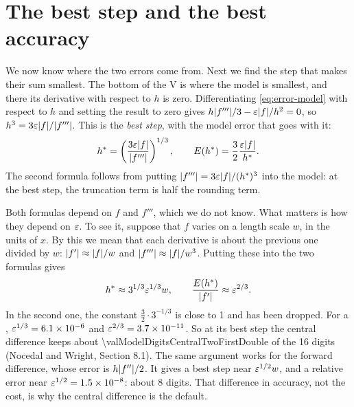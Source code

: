 \section{The best step and the best accuracy}\label{sec:rounding-best}

We now know where the two errors come from. Next we find the step that makes their sum smallest. The bottom of the V
is where the model is smallest, and there its derivative with respect to $h$ is zero. Differentiating
\cref{eq:error-model} with respect to $h$ and setting the result to zero gives
$h \lvert f''' \rvert / 3 - \varepsilon \lvert f \rvert / h^2 = 0$, so $h^3 = 3 \varepsilon \lvert f \rvert / \lvert f''' \rvert$. This is the \emph{best
step}, with the model error that goes with it:
\begin{equation}
  h^{\ast} = \left( \frac{3 \varepsilon \lvert f \rvert}{\lvert f''' \rvert} \right)^{1/3},
  \qquad
  E(h^{\ast}) = \frac{3}{2} \frac{\varepsilon \lvert f \rvert}{h^{\ast}}.
  \label{eq:best-step}
\end{equation}
The second formula follows from putting $\lvert f''' \rvert = 3 \varepsilon \lvert f \rvert / (h^{\ast})^3$ into the model: at the best step,
the truncation term is half the rounding term.

Both formulas depend on $f$ and $f'''$, which we do not know. What matters is how they depend on $\varepsilon$. To see
it, suppose that $f$ varies on a length scale $w$, in the units of $x$. By this we mean that each derivative is about
the previous one divided by $w$: $\lvert f' \rvert \approx \lvert f \rvert / w$ and $\lvert f''' \rvert \approx \lvert f \rvert / w^3$. Putting these into the two formulas
gives
\begin{equation*}
  h^{\ast} \approx 3^{1/3} \varepsilon^{1/3} w,
  \qquad
  \frac{E(h^{\ast})}{\lvert f' \rvert} \approx \varepsilon^{2/3}.
\end{equation*}
In the second one, the constant $\frac{3}{2} \cdot 3^{-1/3}$ is close to 1 and has been dropped. For a ,
$\varepsilon^{1/3} = \num{6.1e-6}$ and $\varepsilon^{2/3} = \num{3.7e-11}$. So at
its best step the central difference keeps about \num{\valModelDigitsCentralTwoFirstDouble} of the 16 digits (Nocedal
and Wright,\cite{nocedal2006} Section 8.1). The same argument works for the forward difference, whose error is
$h \lvert f'' \rvert / 2$. It gives a best step near $\varepsilon^{1/2} w$, and a relative error near
$\varepsilon^{1/2} = \num{1.5e-8}$: about 8 digits. That difference in accuracy, not the cost,
is why the central difference is the default.


